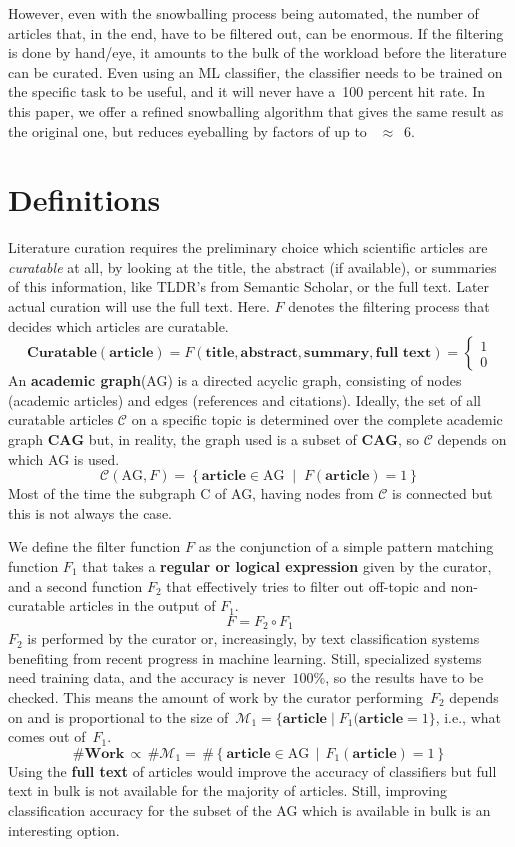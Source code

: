 \documentclass{article}
\begin{document}
However, even with the snowballing process being automated, the number of articles that, in the end, have to be filtered out, can be enormous. If the filtering is done by hand/eye, it amounts to the bulk of the workload before the literature can be curated. Even using an ML classifier\cite{van2021symbals}, the classifier needs to be trained on the specific task to be useful, and it will never have a~100 percent hit rate. In this paper, we offer a refined snowballing algorithm that gives the same result as the original one, but reduces eyeballing by factors of up to ~$\approx$~6.

\section*{Definitions}
Literature curation requires the preliminary choice which scientific articles are \textit{curatable} at all, by looking at the title, the abstract (if available), or summaries of this information, like TLDR's from Semantic Scholar, or the full text. Later actual curation will use the
full text. Here. $F$ denotes the filtering process that decides which articles are curatable.
$$
\textbf{Curatable}(\textbf{article}) =
F(\textbf{title}, \textbf{abstract}, \textbf{summary}, \textbf{full text}) =
\begin{cases}
    1  \\
    0
\end{cases}
$$
An \textbf{academic graph}(AG) is a directed acyclic graph, consisting of nodes (academic articles) and edges (references and citations).
Ideally, the set of all curatable articles $\mathcal{C}$ on a specific topic is determined over the complete academic graph $\mathbf{CAG}$ but, in reality, the graph used is a subset of $\mathbf{CAG}$, so $\mathcal{C}$ depends on which AG is used.
$$
\mathcal{C}(\text{AG},F) = \left\{\textbf{article}\in \text{AG}\;\middle|\;F(\textbf{article}) = 1\right\}
$$
Most of the time the subgraph C of AG, having nodes from $\mathcal{C}$ is connected but this
is not always the case.

We define the filter function $F$ as the conjunction of a simple pattern matching
function $F_1$ that takes a \textbf{regular or logical expression} given by the curator, and a second
function $F_2$ that effectively tries to filter out off-topic and non-curatable articles in the output
of $F_1$.
$$
F = F_2 \circ F_1
$$
$F_2$ is performed by the curator or, increasingly, by text classification systems
benefiting from recent progress in machine learning. Still, specialized systems need training
data, and the accuracy is never~$100$\%, so the results have to be checked. This means the
amount of work by the curator performing~$F_2$ depends on and is proportional to the size
of~$\mathcal{M}_1=\{\textbf{article}\;|\;F_1(\textbf{article}=1\}$, i.e., what comes out of~$F_1$.
$$
\#\textbf{Work} \,\propto\, \#\mathcal{M}_1 = \,\#\left\{\textbf{article}\in \text{AG}\,\middle|\,F_1(\textbf{article}) = 1\right\}
$$
Using the \textbf{full text} of articles would improve the accuracy of classifiers but full text
in bulk is not available for the majority of articles. Still, improving classification
accuracy for the subset of the AG which is available in bulk is an interesting option.
\end{document}
